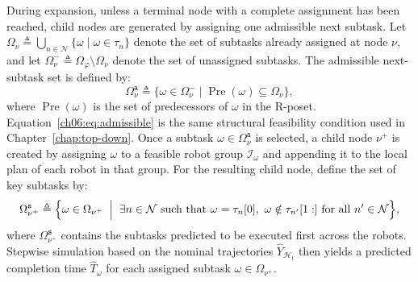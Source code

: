 During expansion, unless a terminal node with a complete assignment has
been reached, child nodes are generated by assigning one admissible
next subtask. Let
$\Omega_{\nu} \triangleq
\bigcup_{n \in \mathcal{N}}\{\omega \mid \omega \in \tau_n\}$
denote the set of subtasks already assigned at node $\nu$, and let
$\Omega_{\nu}^{-} \triangleq \Omega_{\varphi}\setminus\Omega_{\nu}$
denote the set of unassigned subtasks. The admissible next-subtask set
is defined by:
\begin{equation}
\label{ch06:eq:admissible}
\Omega_{\nu}^{\texttt{a}} \triangleq
\{\omega \in \Omega_{\nu}^{-} \mid
\operatorname{Pre}(\omega)\subseteq \Omega_{\nu}\},
\end{equation}
where $\operatorname{Pre}(\omega)$ is the set of predecessors of
$\omega$ in the R-poset. Equation~\eqref{ch06:eq:admissible} is the
same structural feasibility condition used in Chapter~\ref{chap:top-down}.
Once a subtask $\omega \in \Omega_{\nu}^{\texttt{a}}$ is selected, a
child node $\nu^{+}$ is created by assigning $\omega$ to a feasible
robot group $\mathcal{I}_{\omega}$ and appending it to the local plan
of each robot in that group. For the resulting child node, define the
set of key subtasks by:
\begin{equation}
\label{ch06:eq:key-subtasks}
\Omega_{\nu^{+}}^{\texttt{s}} \triangleq
\Bigl\{
\omega \in \Omega_{\nu^{+}}
\;\Bigm|\;
\exists n \in \mathcal{N} \text{ such that } \omega=\tau_n[0],
\ \omega \notin \tau_{n'}[1:] \text{ for all } n' \in \mathcal{N}
\Bigr\},
\end{equation}
where $\Omega_{\nu^{+}}^{\texttt{s}}$ contains the subtasks predicted to
be executed first across the robots. Stepwise simulation based on the
nominal trajectories $\widehat{Y}_{\mathcal{H}_t}$ then yields a
predicted completion time $\widehat{T}_{\omega}$ for each assigned
subtask $\omega \in \Omega_{\nu^{+}}$.


